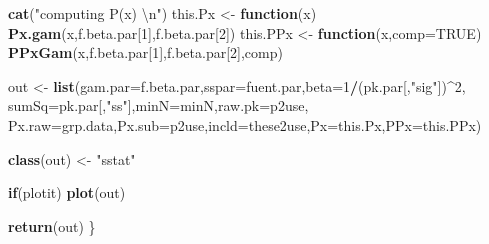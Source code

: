 \documentclass[]{article}
\newenvironment{Shaded}{\begin{snugshade}}{\end{snugshade}}
\newcommand{\KeywordTok}[1]{\textcolor[rgb]{0.13,0.29,0.53}{\textbf{#1}}}
\newcommand{\DataTypeTok}[1]{\textcolor[rgb]{0.13,0.29,0.53}{#1}}
\newcommand{\DecValTok}[1]{\textcolor[rgb]{0.00,0.00,0.81}{#1}}
\newcommand{\CharTok}[1]{\textcolor[rgb]{0.31,0.60,0.02}{#1}}
\newcommand{\StringTok}[1]{\textcolor[rgb]{0.31,0.60,0.02}{#1}}
\newcommand{\OtherTok}[1]{\textcolor[rgb]{0.56,0.35,0.01}{#1}}
\newcommand{\ControlFlowTok}[1]{\textcolor[rgb]{0.13,0.29,0.53}{\textbf{#1}}}
\newcommand{\OperatorTok}[1]{\textcolor[rgb]{0.81,0.36,0.00}{\textbf{#1}}}
\newcommand{\NormalTok}[1]{#1}
\begin{document}
\begin{Shaded}
\begin{Highlighting}[]
    \KeywordTok{cat}\NormalTok{(}\StringTok{"computing P(x) }\CharTok{\textbackslash{}n}\StringTok{"}\NormalTok{)}
\NormalTok{    this.Px <-}\StringTok{ }\ControlFlowTok{function}\NormalTok{(x) }\KeywordTok{Px.gam}\NormalTok{(x,f.beta.par[}\DecValTok{1}\NormalTok{],f.beta.par[}\DecValTok{2}\NormalTok{])}
\NormalTok{    this.PPx <-}\StringTok{ }\ControlFlowTok{function}\NormalTok{(x,}\DataTypeTok{comp=}\OtherTok{TRUE}\NormalTok{) }\KeywordTok{PPxGam}\NormalTok{(x,f.beta.par[}\DecValTok{1}\NormalTok{],f.beta.par[}\DecValTok{2}\NormalTok{],comp)}
    
\NormalTok{    out <-}\StringTok{ }\KeywordTok{list}\NormalTok{(}\DataTypeTok{gam.par=}\NormalTok{f.beta.par,}\DataTypeTok{sspar=}\NormalTok{fuent.par,}\DataTypeTok{beta=}\DecValTok{1}\OperatorTok{/}\NormalTok{(pk.par[,}\StringTok{"sig"}\NormalTok{])}\OperatorTok{^}\DecValTok{2}\NormalTok{,}
                \DataTypeTok{sumSq=}\NormalTok{pk.par[,}\StringTok{"ss"}\NormalTok{],}\DataTypeTok{minN=}\NormalTok{minN,}\DataTypeTok{raw.pk=}\NormalTok{p2use,}
                \DataTypeTok{Px.raw=}\NormalTok{grp.data,}\DataTypeTok{Px.sub=}\NormalTok{p2use,}\DataTypeTok{incld=}\NormalTok{these2use,}\DataTypeTok{Px=}\NormalTok{this.Px,}\DataTypeTok{PPx=}\NormalTok{this.PPx)}
    
    \KeywordTok{class}\NormalTok{(out) <-}\StringTok{ "sstat"}
    
    \ControlFlowTok{if}\NormalTok{(plotit) }\KeywordTok{plot}\NormalTok{(out)}
    
    \KeywordTok{return}\NormalTok{(out)}
\NormalTok{\}}
\end{Highlighting}
\end{Shaded}
\end{document}
